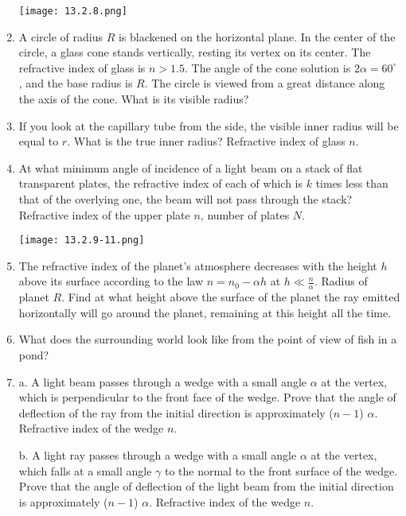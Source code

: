 \documentclass{article}
\begin{document}
\begin{enumerate}[label=13.2.\arabic*]
\begin{center}
    \texttt{[image: 13.2.8.png]}
\end{center}

\item  A circle of radius $R$ is blackened on the horizontal plane. In the center of the circle, a glass cone stands vertically, resting its vertex on its center. The refractive index of glass is $n > 1.5$. The angle of the cone solution is $2 \alpha = 60^\circ$ , and the base radius is $R$. The circle is viewed from a great distance along the axis of the cone. What is its visible radius?

\item If you look at the capillary tube from the side, the visible inner radius will be equal to $r$. What is the true inner radius? Refractive index of glass $n$.

\item  At what minimum angle of incidence of a light beam on a stack of flat transparent plates, the refractive index of each of which is $k$ times less than that of the overlying one, the beam will not pass through the stack? Refractive index of the upper plate $n$, number of plates $N$.

\begin{center}
    \texttt{[image: 13.2.9-11.png]}
\end{center}

\item The refractive index of the planet's atmosphere decreases with the height $h$ above its surface according to the law $n = n_0 - \alpha h$ at $h \ll \frac{n}{\alpha}$. Radius of planet $R$. Find at what height above the surface of the planet the ray emitted horizontally will go around the planet, remaining at this height all the time.

\item  What does the surrounding world look like from the point of view of fish in a pond?

\item  a. A light beam passes through a wedge with a small angle $\alpha$ at the vertex, which is perpendicular to the front face of the wedge. Prove that the angle of deflection of the ray from the initial direction is approximately ($n-1$) $\alpha$. Refractive index of the wedge $n$. 

b. A light ray passes through a wedge with a small angle $\alpha$ at the vertex, which falls at a small angle $\gamma$ to the normal to the front surface of the wedge. Prove that the angle of deflection of the light beam from the initial direction is approximately ($n-1$) $\alpha$. Refractive index of the wedge $n$.


\end{enumerate}
\end{document}
